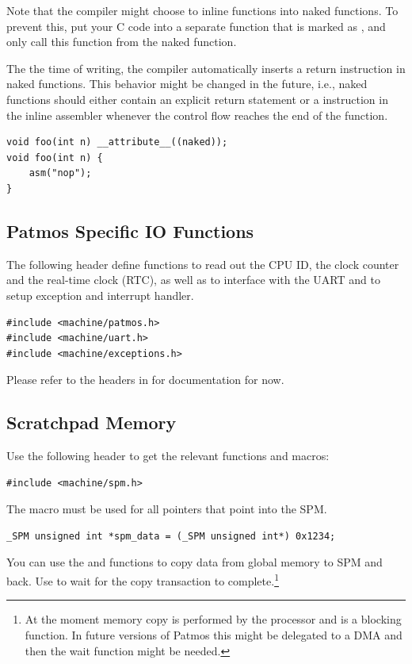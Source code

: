 Note that the compiler might choose to inline functions into naked functions. To prevent this, put your C code into a
separate function that is marked as , and only call this function from the naked function.

The the time of writing, the compiler automatically inserts a return instruction in naked functions. This behavior might be changed
in the future, i.e., naked functions should either contain an explicit return statement or a  instruction in
the inline assembler whenever the control flow reaches the end of the function.

\begin{verbatim}
void foo(int n) __attribute__((naked));
void foo(int n) {
    asm("nop");
}
\end{verbatim}


\subsection{Patmos Specific IO Functions}

The following header define functions to read out the CPU ID, the clock counter and the real-time clock (RTC), as well as to
interface with the UART and to setup exception and interrupt handler.

\begin{verbatim}
#include <machine/patmos.h>
#include <machine/uart.h>
#include <machine/exceptions.h>
\end{verbatim}

Please refer to the headers in  for documentation for now.


\subsection{Scratchpad Memory}

Use the following header to get the relevant functions and macros:

\begin{verbatim}
#include <machine/spm.h>
\end{verbatim}

The  macro must be used for all pointers that point into the SPM.

\begin{verbatim}
_SPM unsigned int *spm_data = (_SPM unsigned int*) 0x1234;
\end{verbatim}

You can use the  and  functions
to copy data from global memory to SPM and back. Use  to
wait for the copy transaction to complete.\footnote{At the moment memory copy is
performed by the processor and is a blocking function. In future versions of Patmos
this might be delegated to a DMA and then the wait function might be needed.}

